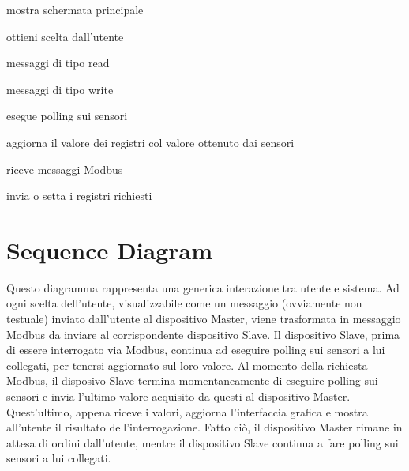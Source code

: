 \documentclass[a4paper,titlepage]{book}
\begin{document}
\begin{usecase}

  	{\item mostra schermata principale}

  	{\item ottieni scelta dall'utente}

  	{\item messaggi di tipo read
				\item messaggi di tipo write}
  

\end{usecase}


\begin{usecase}

		{\item esegue polling sui sensori
				\item aggiorna il valore dei registri col valore ottenuto dai sensori}
  		{\item riceve messaggi Modbus
				\item invia o setta i registri richiesti }

\end{usecase}


\newpage

\section{Sequence Diagram}

Questo diagramma rappresenta una generica interazione tra utente e sistema. Ad ogni scelta dell'utente, visualizzabile come un messaggio (ovviamente non testuale) inviato dall'utente al dispositivo Master, viene trasformata in messaggio Modbus da inviare al corrispondente dispositivo Slave. Il dispositivo Slave, prima di essere interrogato via Modbus, continua ad eseguire polling sui sensori a lui collegati, per tenersi aggiornato sul loro valore. Al momento della richiesta Modbus, il disposivo Slave termina momentaneamente di eseguire polling sui sensori e invia l'ultimo valore acquisito da questi al dispositivo Master. Quest'ultimo, appena riceve i valori, aggiorna l'interfaccia grafica e mostra all'utente il risultato dell'interrogazione. Fatto ciò, il dispositivo Master rimane in attesa di ordini dall'utente, mentre il dispositivo Slave continua a fare polling sui sensori a lui collegati.
\end{document}
